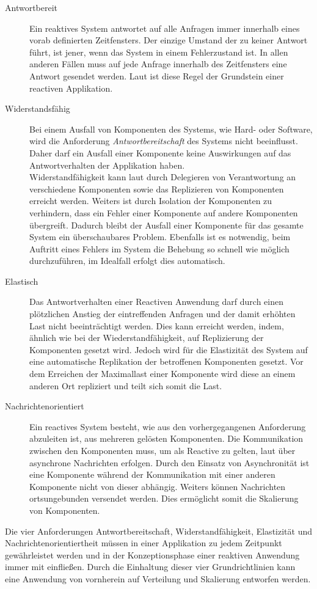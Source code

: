 \begin{description}
  \item[Antwortbereit]\label{reactivo:responsive}
  Ein reaktives System antwortet auf alle Anfragen immer innerhalb eines vorab definierten Zeitfensters. Der einzige Umstand der zu keiner Antwort führt, ist jener, wenn das System in einem Fehlerzustand ist. In allen anderen Fällen muss auf jede Anfrage innerhalb des Zeitfensters eine Antwort gesendet werden.
  Laut \cite{reactiveManifesto} ist diese Regel der Grundstein einer reactiven Applikation.
  \item[Widerstandsfähig]\label{reactivo:resilient}
  Bei einem Ausfall von Komponenten des Systems, wie Hard- oder Software, wird die Anforderung \textit{Antwortbereitschaft} des Systems nicht beeinflusst. Daher darf ein Ausfall einer Komponente keine Auswirkungen auf das Antwortverhalten der Applikation haben.\\
  Widerstandfähigkeit kann laut \cite{reactiveManifesto} durch Delegieren von Verantwortung an verschiedene Komponenten sowie das Replizieren von Komponenten erreicht werden. Weiters ist durch Isolation der Komponenten zu verhindern, dass ein Fehler einer Komponente auf andere Komponenten übergreift. Dadurch bleibt der Ausfall einer Komponente für das gesamte System ein überschaubares Problem. Ebenfalls ist es notwendig, beim Auftritt eines Fehlers im System die Behebung so schnell wie möglich durchzuführen, im Idealfall erfolgt dies automatisch.
  \item[Elastisch]\label{reactivo:elastic}
  Das Antwortverhalten einer Reactiven Anwendung darf durch einen plötzlichen Anstieg der eintreffenden Anfragen und der damit erhöhten Last nicht beeinträchtigt werden. Dies kann erreicht werden, indem, ähnlich wie bei der Wiederstandfähigkeit, auf Replizierung der Komponenten gesetzt wird. Jedoch wird für die Elastizität des System auf eine automatische Replikation der betroffenen Komponenten gesetzt. Vor dem Erreichen der Maximallast einer Komponente wird diese an einem anderen Ort repliziert und teilt sich somit die Last. 
  \item[Nachrichtenorientiert]\label{reactivo:messageDriven}
  Ein reactives System besteht, wie aus den vorhergegangenen Anforderung abzuleiten ist, aus mehreren gelösten Komponenten. Die Kommunikation zwischen den Komponenten muss, um als Reactive zu gelten, laut \cite{reactiveManifesto} über asynchrone Nachrichten erfolgen. Durch den Einsatz von Asynchronität ist eine Komponente während der Kommunikation mit einer anderen Komponente nicht von dieser abhängig. Weiters können Nachrichten ortsungebunden versendet werden. Dies ermöglicht somit die Skalierung von Komponenten. 
\end{description} 
Die vier Anforderungen Antwortbereitschaft, Widerstandfähigkeit, Elastizität und Nachrichtenorientiertheit müssen in einer Applikation zu jedem Zeitpunkt gewährleistet werden und in der Konzeptionsphase einer reaktiven Anwendung immer mit einfließen. Durch die Einhaltung dieser vier Grundrichtlinien kann eine Anwendung von vornherein auf Verteilung und Skalierung entworfen werden.\\

